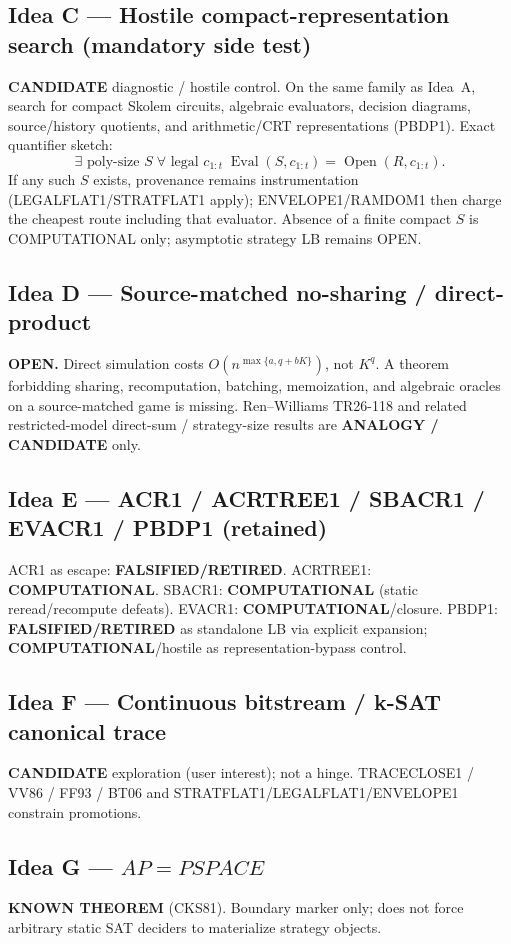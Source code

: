 \documentclass[11pt]{article}
\begin{document}
\subsection*{Idea C --- Hostile compact-representation search (mandatory side test)}
\textbf{CANDIDATE} diagnostic / hostile control. On the same family as Idea~A,
search for compact Skolem circuits, algebraic evaluators, decision diagrams,
source/history quotients, and arithmetic/CRT representations (PBDP1). Exact
quantifier sketch:
\[
\exists\text{ poly-size }S\;\forall\text{ legal }c_{1:t}\;
\operatorname{Eval}(S,c_{1:t})=\operatorname{Open}(R,c_{1:t}).
\]
If any such $S$ exists, provenance remains instrumentation (LEGALFLAT1/STRATFLAT1
apply); ENVELOPE1/RAMDOM1 then charge the cheapest route including that evaluator.
Absence of a finite compact $S$ is COMPUTATIONAL only; asymptotic strategy LB
remains OPEN.

\subsection*{Idea D --- Source-matched no-sharing / direct-product}
\textbf{OPEN.} Direct simulation costs $O(n^{\max\{a,q+bK\}})$, not $K^q$.
A theorem forbidding sharing, recomputation, batching, memoization, and algebraic
oracles on a source-matched game is missing. Ren--Williams TR26-118 and related
restricted-model direct-sum / strategy-size results are \textbf{ANALOGY / CANDIDATE}
only.

\subsection*{Idea E --- ACR1 / ACRTREE1 / SBACR1 / EVACR1 / PBDP1 (retained)}
ACR1 as escape: \textbf{FALSIFIED/RETIRED}.
ACRTREE1: \textbf{COMPUTATIONAL}.
SBACR1: \textbf{COMPUTATIONAL} (static reread/recompute defeats).
EVACR1: \textbf{COMPUTATIONAL}/closure.
PBDP1: \textbf{FALSIFIED/RETIRED} as standalone LB via explicit expansion;
\textbf{COMPUTATIONAL}/hostile as representation-bypass control.

\subsection*{Idea F --- Continuous bitstream / k-SAT canonical trace}
\textbf{CANDIDATE} exploration (user interest); not a hinge. TRACECLOSE1 / VV86 /
FF93 / BT06 and STRATFLAT1/LEGALFLAT1/ENVELOPE1 constrain promotions.

\subsection*{Idea G --- $AP=PSPACE$}
\textbf{KNOWN THEOREM} (CKS81). Boundary marker only; does not force arbitrary
static SAT deciders to materialize strategy objects.
\end{document}
